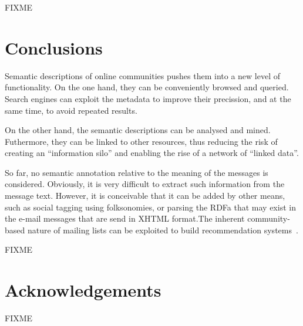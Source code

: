 \documentclass{../templates/www2008-submission}
\begin{document}
FIXME


\section{\label{sec:conclusions}Conclusions}

Semantic descriptions of online communities pushes them
into a new level of functionality. On the one hand, they can be
conveniently browsed and queried. Search engines can exploit the
metadata to improve their precission, and at the same time, to
avoid repeated results.

On the other hand, the semantic descriptions can be
analysed and mined. Futhermore, they can be linked to other resources,
thus reducing the risk of creating an ``information silo'' and
enabling the rise of a network of ``linked data''.

So far, no semantic annotation relative to the meaning of
the messages is considered. Obviously, it is very difficult
to extract such information from the message text.
However, it is conceivable that it can be added by other 
means, such as social tagging using folksonomies, or parsing the 
RDFa that may exist in the e-mail messages that are send in XHTML 
format.The inherent community-based nature of mailing lists can
be exploited to build recommendation systems~\cite{Celma2006}.

FIXME

\section*{Acknowledgements}

FIXME





\balancecolumns
\end{document}
